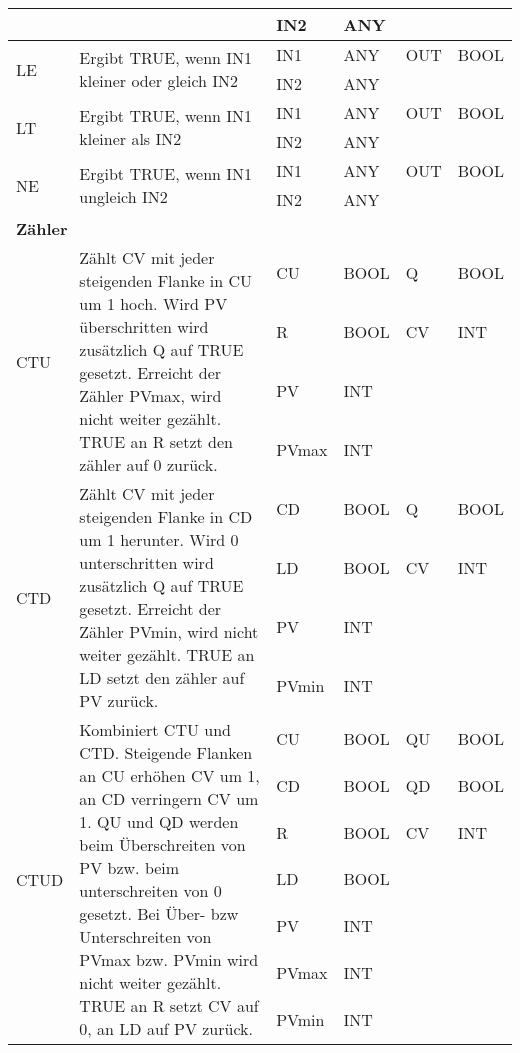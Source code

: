 {\begin{table}
\begin{tabular}{|m{2cm}|m{7cm}|>{\raggedright}m{0.75cm} >{\raggedleft}m{1cm}|>{\raggedright}m{0.75cm} >{\raggedleft\arraybackslash}m{1cm}|}
 & &IN2 & ANY & &\\
\hline
\multirow{2}{*}{LE}&\multirow{2}{7cm}{Ergibt TRUE, wenn IN1 kleiner oder gleich IN2}& IN1 & ANY & OUT & BOOL\\
 & &IN2 & ANY & &\\
\hline
\multirow{2}{*}{LT}&\multirow{2}{7cm}{Ergibt TRUE, wenn IN1 kleiner als IN2}& IN1 & ANY & OUT & BOOL\\
 & &IN2 & ANY & &\\
\hline
\multirow{2}{*}{NE}&\multirow{2}{7cm}{Ergibt TRUE, wenn IN1 ungleich IN2}& IN1 & ANY & OUT & BOOL\\
 & &IN2 & ANY & &\\
\hline
\multicolumn{6}{|l|}{\textbf{Zähler}}\\
\hline
\multirow{4}{*}{CTU}&\multirow{4}{7cm}{Zählt CV mit jeder steigenden Flanke in CU um 1 hoch. Wird PV überschritten wird zusätzlich Q auf TRUE gesetzt. Erreicht der Zähler PVmax, wird nicht weiter gezählt. TRUE an R setzt den zähler auf 0 zurück.}& CU & BOOL & Q & BOOL\\
 & &R & BOOL & CV & INT\\
 & & PV & INT & &\\
 & & PVmax & INT & &\\
\hline
\multirow{4}{*}{CTD}&\multirow{4}{7cm}{Zählt CV mit jeder steigenden Flanke in CD um 1 herunter. Wird 0 unterschritten wird zusätzlich Q auf TRUE gesetzt. Erreicht der Zähler PVmin, wird nicht weiter gezählt. TRUE an LD setzt den zähler auf PV zurück.}& CD & BOOL & Q & BOOL\\
 & &LD & BOOL & CV & INT\\
 & & PV & INT & &\\
 & & PVmin & INT & &\\
\hline
\multirow{7}{*}{CTUD}&\multirow{7}{7cm}{Kombiniert CTU und CTD. Steigende Flanken an CU erhöhen CV um 1, an CD verringern CV um 1. QU und QD werden beim Überschreiten von PV bzw. beim unterschreiten von 0 gesetzt. Bei Über- bzw Unterschreiten von PVmax bzw. PVmin wird nicht weiter gezählt. TRUE an R setzt CV auf 0, an LD auf PV zurück.}& CU & BOOL & QU & BOOL\\
 & & CD & BOOL & QD & BOOL\\
 & & R & BOOL & CV & INT\\
 & & LD & BOOL & &\\
 & & PV & INT & &\\
 & & PVmax & INT & &\\
 & & PVmin & INT & &\\
\hline


\end{tabular}
\end{table}}
